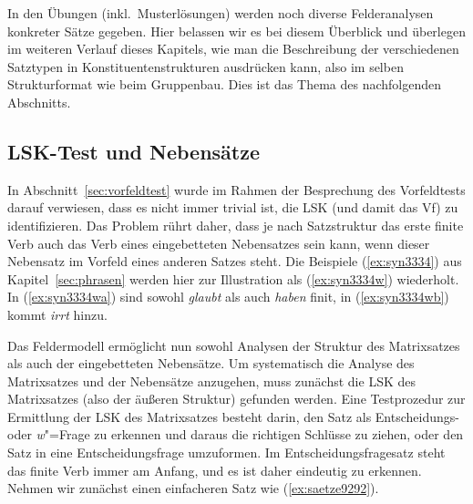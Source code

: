 In den Übungen (inkl.\ Musterlösungen) werden noch diverse Felderanalysen konkreter Sätze gegeben.
Hier belassen wir es bei diesem Überblick und überlegen im weiteren Verlauf dieses Kapitels, wie man die Beschreibung der verschiedenen Satztypen in Konstituentenstrukturen ausdrücken kann, also im selben Strukturformat wie beim Gruppenbau.
Dies ist das Thema des nachfolgenden Abschnitts.


\subsection{LSK-Test und Nebensätze}

\label{sec:lsktest}

In Abschnitt~\ref{sec:vorfeldtest} wurde im Rahmen der Besprechung des Vorfeldtests darauf verwiesen, dass es nicht immer trivial ist, die LSK (und damit das Vf) zu identifizieren.
Das Problem rührt daher, dass je nach Satzstruktur das erste finite Verb auch das Verb eines eingebetteten Nebensatzes sein kann, wenn dieser Nebensatz \zB im Vorfeld eines anderen Satzes steht.
Die Beispiele (\ref{ex:syn3334}) aus Kapitel~\ref{sec:phrasen} werden hier zur Illustration als (\ref{ex:syn3334w}) wiederholt.
In (\ref{ex:syn3334wa}) sind sowohl \textit{glaubt} als auch \textit{haben} finit, in (\ref{ex:syn3334wb}) kommt \textit{irrt} hinzu.

\begin{exe}
  \ex\label{ex:syn3334w}
  \begin{xlist}
  \end{xlist}
\end{exe}

Das Feldermodell ermöglicht nun sowohl Analysen der Struktur des Matrixsatzes als auch der eingebetteten Nebensätze.
Um systematisch die Analyse des Matrixsatzes und der Nebensätze anzugehen, muss zunächst die LSK des Matrixsatzes (also der äußeren Struktur) gefunden werden.
Eine Testprozedur zur Ermittlung der LSK des Matrixsatzes besteht darin, den Satz als Entscheidungs- oder \textit{w}"=Frage zu erkennen und daraus die richtigen Schlüsse zu ziehen, oder den Satz in eine Entscheidungsfrage umzuformen.
Im Entscheidungsfragesatz steht das finite Verb immer am Anfang, und es ist daher eindeutig zu erkennen.
Nehmen wir zunächst einen einfacheren Satz wie (\ref{ex:saetze9292}).

